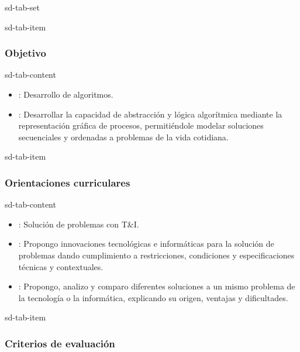 \documentclass[letterpaper,10pt,spanish]{sphinxmanual}
\begin{document}
\begin{sphinxuseclass}{sd-tab-set}
\begin{sphinxuseclass}{sd-tab-item}\subsubsection*{Objetivo}

\begin{sphinxuseclass}{sd-tab-content}\begin{itemize}
\item {} 
\sphinxAtStartPar
{}: Desarrollo de algoritmos.

\item {} 
\sphinxAtStartPar
{}: Desarrollar la capacidad de abstracción y lógica algorítmica mediante la representación gráfica de procesos, permitiéndole modelar soluciones secuenciales y ordenadas a problemas de la vida cotidiana.

\end{itemize}

\end{sphinxuseclass}
\end{sphinxuseclass}
\begin{sphinxuseclass}{sd-tab-item}\subsubsection*{Orientaciones curriculares}

\begin{sphinxuseclass}{sd-tab-content}\begin{itemize}
\item {} 
\sphinxAtStartPar
{}: Solución de problemas con T\&I.

\item {} 
\sphinxAtStartPar
{}: Propongo innovaciones tecnológicas e informáticas para la solución de problemas dando cumplimiento a restricciones, condiciones y especificaciones técnicas y contextuales.

\item {} 
\sphinxAtStartPar
{}: Propongo, analizo y comparo diferentes soluciones a un mismo problema de la tecnología o la informática, explicando su origen, ventajas y dificultades.

\end{itemize}

\end{sphinxuseclass}
\end{sphinxuseclass}
\begin{sphinxuseclass}{sd-tab-item}\subsubsection*{Criterios de evaluación}


\end{sphinxuseclass}
\end{sphinxuseclass}
\end{document}
